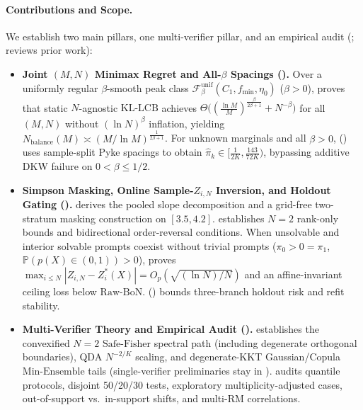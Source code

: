 \documentclass{article}
\theoremstyle{plain}
\theoremstyle{definition}
\theoremstyle{remark}
\newcommand{\Prob}{\mathbb{P}}
\begin{document}
\paragraph{Contributions and Scope.}
We establish two main pillars, one multi-verifier pillar, and an empirical audit (;  reviews prior work):
\begin{itemize}[leftmargin=1.4em,itemsep=1pt,topsep=1pt]
    \item \textbf{Joint $(M,N)$ Minimax Regret and All-$\beta$ Spacings ().} Over a uniformly regular $\beta$-smooth peak class $\mathcal{F}_\beta^{\mathrm{unif}}(C_1, f_{\min}, \eta_0)$ ($\beta > 0$),  proves that static $N$-agnostic $\mathrm{KL\text{-}LCB}$ achieves $\Theta\big((\frac{\ln M}{M})^{\frac{\beta}{2\beta+1}} + N^{-\beta}\big)$ for all $(M,N)$ without $(\ln N)^\beta$ inflation, yielding $N_{\mathrm{balance}}(M) \asymp (M/\ln M)^{\frac{1}{2\beta+1}}$. For unknown marginals and all $\beta > 0$,  () uses sample-split Pyke spacings to obtain $\hat{\pi}_k \in [\frac{1}{2K}, \frac{143}{72K})$, bypassing additive DKW failure on $0 < \beta \le 1/2$.
    \item \textbf{Simpson Masking, Online Sample-$Z_{i,N}$ Inversion, and Holdout Gating ().}  derives the pooled slope decomposition and a grid-free two-stratum masking construction on $[3.5, 4.2]$.  establishes $N=2$ rank-only bounds and bidirectional order-reversal conditions. When unsolvable and interior solvable prompts coexist without trivial prompts ($\pi_0 > 0 = \pi_1$, $\Prob(p(X)\in(0,1))>0$),  proves $\max_{i\le N}|Z_{i,N} - Z_i^*(X)| = O_p(\sqrt{(\ln N)/N})$ and an affine-invariant ceiling loss below $\mathrm{Raw\text{-}BoN}$.  () bounds three-branch holdout risk and refit stability.
    \item \textbf{Multi-Verifier Theory and Empirical Audit ().}  establishes the convexified $N=2$ $\mathrm{Safe\text{-}Fisher}$ spectral path (including degenerate orthogonal boundaries), QDA $N^{-2/K}$ scaling, and degenerate-KKT Gaussian/Copula $\mathrm{Min\text{-}Ensemble}$ tails (single-verifier preliminaries stay in ).  audits quantile protocols, disjoint 50/20/30 tests, exploratory multiplicity-adjusted cases, out-of-support vs.\ in-support shifts, and multi-RM correlations.
\end{itemize}
\end{document}
